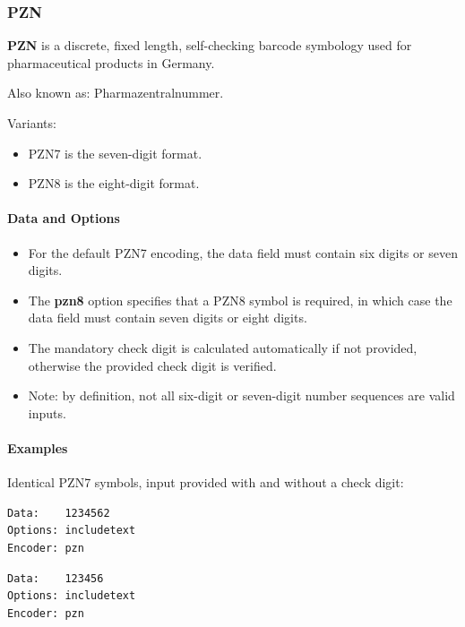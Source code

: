 \hypertarget{pzn}{%
\subsubsection{PZN}\label{pzn}}

\textbf{PZN} is a discrete, fixed length, self-checking barcode
symbology used for pharmaceutical products in Germany.

Also known as: Pharmazentralnummer.

Variants:

\begin{itemize}
\tightlist
\item
  PZN7 is the seven-digit format.
\item
  PZN8 is the eight-digit format.
\end{itemize}

\hypertarget{data-and-options-57}{%
\paragraph{Data and Options}\label{data-and-options-57}}

\begin{itemize}
\tightlist
\item
  For the default PZN7 encoding, the data field must contain six digits
  or seven digits.
\item
  The \textbf{pzn8} option specifies that a PZN8 symbol is required, in
  which case the data field must contain seven digits or eight digits.
\item
  The mandatory check digit is calculated automatically if not provided,
  otherwise the provided check digit is verified.
\item
  Note: by definition, not all six-digit or seven-digit number sequences
  are valid inputs.
\end{itemize}

\hypertarget{examples-37}{%
\paragraph{Examples}\label{examples-37}}

Identical PZN7 symbols, input provided with and without a check digit:

\begin{verbatim}
Data:    1234562
Options: includetext
Encoder: pzn
\end{verbatim}

\begin{verbatim}
Data:    123456
Options: includetext
Encoder: pzn
\end{verbatim}

